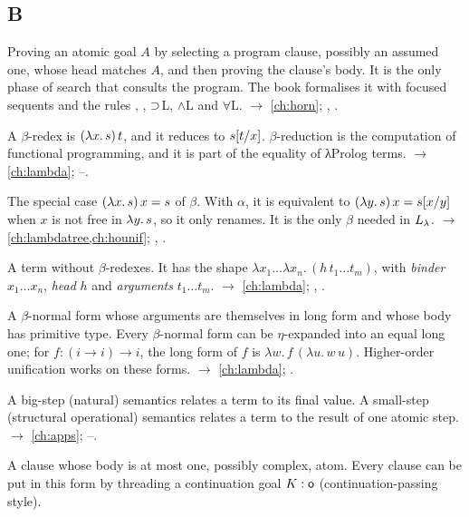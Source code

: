 \subsection*{B}
\begin{glossarylist}
\item[Backchaining] Proving an atomic goal $A$ by selecting a program clause, possibly an assumed one, whose head
  matches $A$, and then proving the clause's body. It is the only phase of search that consults the program.
  The book formalises it with focused sequents and the rules , , $\supset$L,
  $\wedge$L and $\forall$L. $\rightarrow$ \cref{ch:horn}; , .
\item[$\beta$-conversion, $\beta$-redex, $\beta$-reduction] A $\beta$-redex is $(\lambda x.\,s)\,t$, and it reduces
  to $s[t/x]$. $\beta$-reduction is the computation of functional programming, and it is part of the
  equality of λProlog terms. $\rightarrow$ \cref{ch:lambda}; --.
\item[$\beta_0$-conversion] The special case $(\lambda x.\,s)\,x = s$ of $\beta$. With $\alpha$, it is equivalent to
  $(\lambda y.\,s)\,x=s[x/y]$ when $x$ is not free in $\lambda y.\,s$, so it only renames. It is the only $\beta$
  needed in $L_\lambda$. $\rightarrow$ \cref{ch:lambdatree,ch:hounif}; , .
\item[$\beta$-normal form] A term without $\beta$-redexes. It has the shape
  $\lambda x_1\dots\lambda x_n.\,(h\,t_1\dots t_m)$, with \emph{binder} $x_1\dots x_n$, \emph{head} $h$ and
  \emph{arguments} $t_1\dots t_m$. $\rightarrow$ \cref{ch:lambda}; , .
\item[$\beta\eta$-long normal form] A $\beta$-normal form whose arguments are themselves in long form and whose
  body has primitive type. Every $\beta$-normal form can be $\eta$-expanded into an equal long one; for
  $f:(i\to i)\to i$, the long form of $f$ is $\lambda w.\,f\,(\lambda u.\,w\,u)$. Higher-order unification works on
  these forms.
  $\rightarrow$ \cref{ch:lambda}; .
\item[Big-step / small-step semantics] A big-step (natural) semantics relates a term to its final value. A
  small-step (structural operational) semantics relates a term to the result of one atomic step.
  $\rightarrow$ \cref{ch:apps}; --.
\item[Binary clause] A clause whose body is at most one, possibly complex, atom. Every clause can be put in this
  form by threading a continuation goal $K:\mathsf{o}$ (continuation-passing style).

\end{glossarylist}

